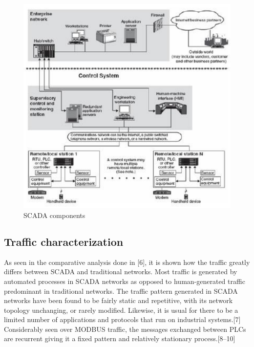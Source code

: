 \documentclass[11pt,]{article}
\begin{document}
\begin{figure}

{\centering \includegraphics{thesis_files/figure-latex/unnamed-chunk-4-1} 

}

\caption{SCADA components}\label{fig:unnamed-chunk-4}
\end{figure}

\subsection{Traffic characterization}\label{traffic-characterization}

As seen in the comparative analysis done in {[}6{]}, it is shown how the
traffic greatly differs between SCADA and traditional networks. Most
traffic is generated by automated processes in SCADA networks as opposed
to human-generated traffic predominant in traditional networks. The
traffic pattern generated in SCADA networks have been found to be fairly
static and repetitive, with its network topology unchanging, or rarely
modified. Likewise, it is usual for there to be a limited number of
applications and protocols that run on industrial systems.{[}7{]}
Considerably seen over MODBUS traffic, the messages exchanged between
PLCs are recurrent giving it a fixed pattern and relatively stationary
process.{[}8--10{]}
\end{document}
